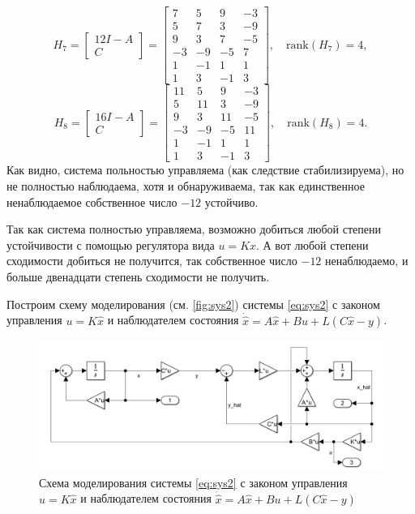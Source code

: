    \begin{equation*}
        H_7 = \begin{bmatrix}
            12 I - A \\ C
        \end{bmatrix}=\begin{bmatrix}
         7 & 5 & 9 & -3 \\
         5 & 7 & 3 & -9 \\
         9 & 3 & 7 & -5 \\
        -3 & -9 & -5 & 7 \\
         1 & -1 & 1 & 1 \\
         1 & 3 & -1 & 3
        \end{bmatrix},
        \quad\text{rank}(H_7) = 4,
    \end{equation*}
    \begin{equation*}
        H_8 = \begin{bmatrix}
            16 I - A \\ C
        \end{bmatrix}=\begin{bmatrix}
        11 & 5 & 9 & -3 \\
         5 & 11 & 3 & -9 \\
         9 & 3 & 11 & -5 \\
        -3 & -9 & -5 & 11 \\
         1 & -1 & 1 & 1 \\
         1 & 3 & -1 & 3
    \end{bmatrix},
    \quad\text{rank}(H_8) = 4.
\end{equation*}
Как видно, система польностью управляема (как следствие стабилизируема), 
но не полностью наблюдаема, хотя и обнаруживаема, так как единственное
ненаблюдаемое собственное число $-12$ устойчиво.

Так как система полностью управляема, возможно добиться любой степени
устойчивости с помощью регулятора вида $u=Kx.$ А вот любой степени сходимости
добиться не получится, так собственное число $-12$ ненаблюдаемо, и больше
двенадцати степень сходимости не получить.

Построим схему моделирования (см. \autoref{fig:sys2}) системы \eqref{eq:sys2} 
с законом управления $u=K\hat x$
и наблюдателем состояния $\dot{\hat x}=A\hat x+Bu+L(C\hat x-y)$.
\begin{figure}[H]
    \centering
    \includegraphics[width=\textwidth]{figs/task2_slx.png}
    \caption{Схема моделирования системы \eqref{eq:sys2} 
    с законом управления $u=K\hat x$
    и наблюдателем состояния $\dot{\hat x}=A\hat x+Bu+L(C\hat x-y)$}
    \label{fig:sys2}
\end{figure}

